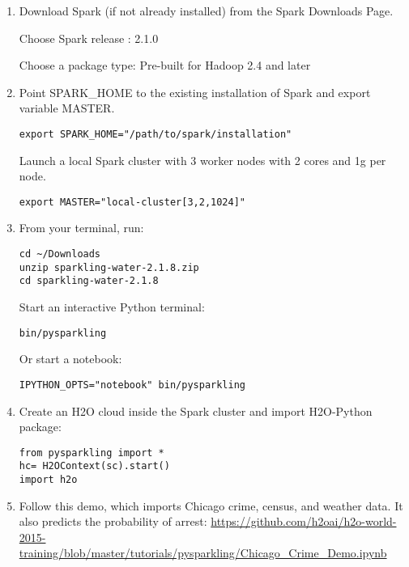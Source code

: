 \begin{enumerate}
\item Download Spark (if not already installed) from the Spark Downloads Page.

Choose Spark release : 2.1.0

Choose a package type: Pre-built for Hadoop 2.4 and later

\item Point SPARK\_HOME to the existing installation of Spark and export variable MASTER.

\begin{lstlisting}[style=Bash]
export SPARK_HOME="/path/to/spark/installation" 
\end{lstlisting}

Launch a local Spark cluster with 3 worker nodes with 2 cores and 1g per node.
\begin{lstlisting}[style=Bash]
export MASTER="local-cluster[3,2,1024]" 
\end{lstlisting}

\item From your terminal, run:

\begin{lstlisting}[style=Bash]
cd ~/Downloads
unzip sparkling-water-2.1.8.zip
cd sparkling-water-2.1.8
\end{lstlisting}

Start an interactive Python terminal:
\begin{lstlisting}[style=Bash]
bin/pysparkling
\end{lstlisting}

Or start a notebook:
\begin{lstlisting}[style=Bash]
IPYTHON_OPTS="notebook" bin/pysparkling
\end{lstlisting}

\item Create an H2O cloud inside the Spark cluster and import H2O-Python package:

\begin{lstlisting}[style=Scala]
from pysparkling import *
hc= H2OContext(sc).start()
import h2o
\end{lstlisting}

\item Follow this demo, which imports Chicago crime, census, and weather data. It also predicts the probability of arrest:
 \url{https://github.com/h2oai/h2o-world-2015-training/blob/master/tutorials/pysparkling/Chicago_Crime_Demo.ipynb}

\end{enumerate}

